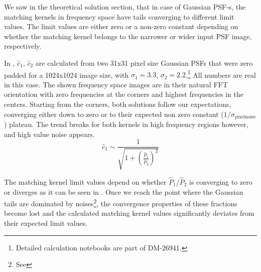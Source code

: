 %
\par We saw in the theoretical solution section, that in case of
Gaussian PSF-s, the matching kernels in frequency space have tails
converging to different limit values. The limit values are either zero
or a non-zero constant depending on whether the matching kernel belongs
to the narrower or wider input PSF image, respectively.
%
\par In , \(\hat{c}_1\),
\(\hat{c}_2\) are calculated from two 31x31 pixel size Gaussian PSFs
that were zero padded for a 1024x1024 image size, with
\(\sigma_1=3.3\), \(\sigma_2=2.2\).\footnote{Detailed calculation
notebooks are part of DM-26941.} All numbers are real in this
case. The shown frequency space images are in their natural FFT
orientation with zero frequencies at the corners and highest
frequencies in the centers. Starting from the corners, both solutions
follow our expectations, converging either down to zero or to their
expected non zero constant (\( 1/\sigma_{\mathrm{pixelnoise}} \) )
plateau. The trend breaks for both kernels in high frequency regions
however, and high value noise appears.
\begin{equation}
\hat{c}_1 \sim \frac{1}{\sqrt{1 + \left(\frac{\hat{P}_1}{\hat{P}_2}\right)^2}}
\label{eq:c1conv}
\end{equation}
\par The matching kernel limit values depend on whether
\(\hat{P}_1/\hat{P}_2\) is converging to zero or diverges as it can be seen
in . Once we reach the point where the Gaussian tails are
dominated by noises\footnote{See }, the convergence
properties of these fractions become lost and the calculated matching kernel
values significantly deviates from their expected limit values.
%

